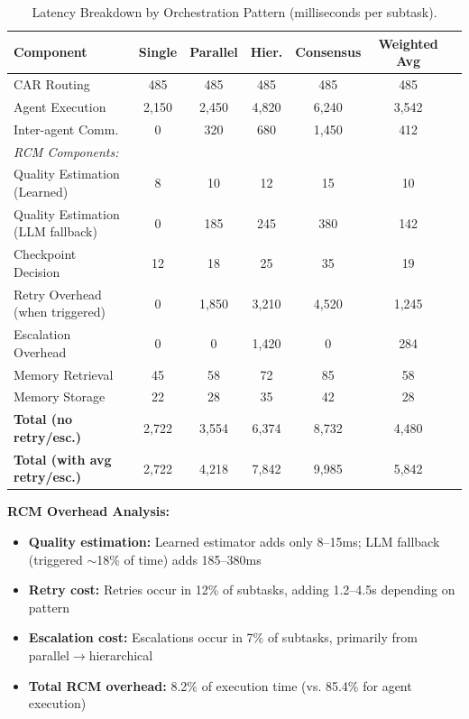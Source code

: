 \documentclass{article}
\theoremstyle{plain}
\theoremstyle{definition}
\theoremstyle{remark}
\begin{document}
\begin{table}[h]
	\caption{Latency Breakdown by Orchestration Pattern (milliseconds per subtask).}
	\label{tab:latency_per_pattern}
	\centering
	\small
	\setlength{\tabcolsep}{3pt}
	\begin{tabular}{@{}lcccccc@{}}
		\toprule
		\textbf{Component} & \textbf{Single} & \textbf{Parallel} & \textbf{Hier.} & \textbf{Consensus} & \textbf{Weighted Avg} \\
		\midrule
		CAR Routing & 485 & 485 & 485 & 485 & 485 \\
		Agent Execution & 2,150 & 2,450 & 4,820 & 6,240 & 3,542 \\
		Inter-agent Comm. & 0 & 320 & 680 & 1,450 & 412 \\
		\midrule
		\textit{RCM Components:} & & & & & \\
		\quad Quality Estimation (Learned) & 8 & 10 & 12 & 15 & 10 \\
		\quad Quality Estimation (LLM fallback) & 0 & 185 & 245 & 380 & 142 \\
		\quad Checkpoint Decision & 12 & 18 & 25 & 35 & 19 \\
		\quad Retry Overhead (when triggered) & 0 & 1,850 & 3,210 & 4,520 & 1,245 \\
		\quad Escalation Overhead & 0 & 0 & 1,420 & 0 & 284 \\
		\midrule
		Memory Retrieval & 45 & 58 & 72 & 85 & 58 \\
		Memory Storage & 22 & 28 & 35 & 42 & 28 \\
		\midrule
		\textbf{Total (no retry/esc.)} & 2,722 & 3,554 & 6,374 & 8,732 & 4,480 \\
		\textbf{Total (with avg retry/esc.)} & 2,722 & 4,218 & 7,842 & 9,985 & 5,842 \\
		\bottomrule
	\end{tabular}
\end{table}

\textbf{RCM Overhead Analysis:}
\begin{itemize}[nosep,leftmargin=*]
	\item \textbf{Quality estimation:} Learned estimator adds only 8--15ms; LLM fallback (triggered $\sim$18\% of time) adds 185--380ms
	\item \textbf{Retry cost:} Retries occur in 12\% of subtasks, adding 1.2--4.5s depending on pattern
	\item \textbf{Escalation cost:} Escalations occur in 7\% of subtasks, primarily from parallel$\rightarrow$hierarchical
	\item \textbf{Total RCM overhead:} 8.2\% of execution time (vs. 85.4\% for agent execution)
\end{itemize}
\end{document}
